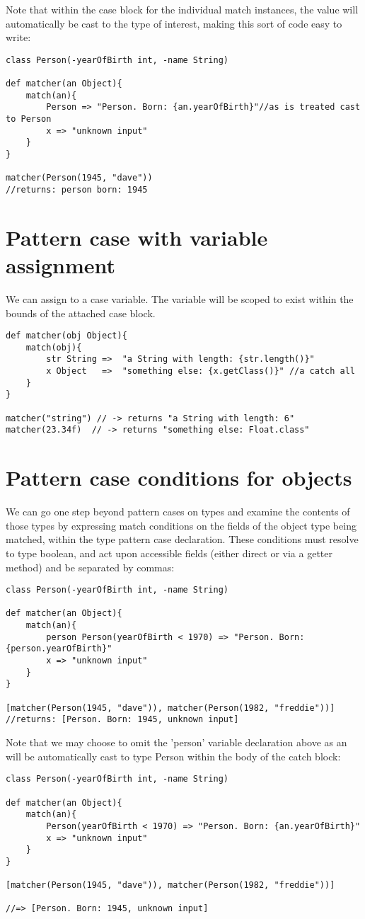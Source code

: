 \documentclass[conc-doc]{subfiles}
\begin{document}
Note that within the case block for the individual match instances, the value will automatically be cast to the type of interest, making this sort of code easy to write:
\begin{lstlisting}
class Person(-yearOfBirth int, -name String)

def matcher(an Object){
	match(an){
		Person => "Person. Born: {an.yearOfBirth}"//as is treated cast to Person
		x => "unknown input"
	}
}

matcher(Person(1945, "dave"))
//returns: person born: 1945
\end{lstlisting}


\section{Pattern case with variable assignment}
We can assign to a case variable. The variable will be scoped to exist within the bounds of the attached case block.

\begin{lstlisting}
def matcher(obj Object){
	match(obj){
		str String =>  "a String with length: {str.length()}" 
		x Object   =>  "something else: {x.getClass()}" //a catch all
	}
}

matcher("string") // -> returns "a String with length: 6"
matcher(23.34f)  // -> returns "something else: Float.class"
\end{lstlisting}


\section{Pattern case conditions for objects}
We can go one step beyond pattern cases on types and examine the contents of those types by expressing match conditions on the fields of the object type being matched, within the type pattern case declaration. These conditions must resolve to type boolean, and act upon accessible fields (either direct or via a getter method) and be separated by commas:
\begin{lstlisting}
class Person(-yearOfBirth int, -name String)

def matcher(an Object){
	match(an){
		person Person(yearOfBirth < 1970) => "Person. Born: {person.yearOfBirth}"
		x => "unknown input"
	}
}

[matcher(Person(1945, "dave")), matcher(Person(1982, "freddie"))]
//returns: [Person. Born: 1945, unknown input]
\end{lstlisting}

Note that we may choose to omit the 'person' variable declaration above as an will be automatically cast to type Person within the body of the catch block:
\begin{lstlisting}
class Person(-yearOfBirth int, -name String)

def matcher(an Object){
	match(an){
		Person(yearOfBirth < 1970) => "Person. Born: {an.yearOfBirth}"
		x => "unknown input"
	}
}

[matcher(Person(1945, "dave")), matcher(Person(1982, "freddie"))]

//=> [Person. Born: 1945, unknown input]
\end{lstlisting}
\end{document}
